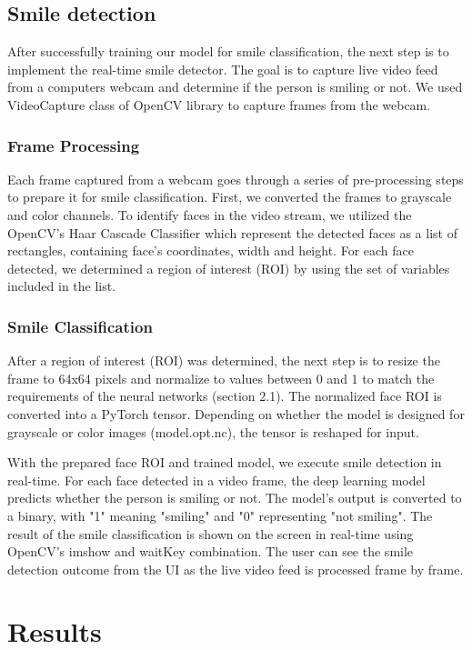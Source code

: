 \documentclass[12pt,a4paper,english
]{tunithesis}
\begin{document}
\section{Smile detection}
After successfully training our model for smile classification, the next step is to implement the real-time smile detector. The goal is to capture live video feed from a computers webcam and determine if the person is smiling or not. We used VideoCapture class of OpenCV library to capture frames from the webcam. 

\subsection{Frame Processing}
Each frame captured from a webcam goes through a series of pre-processing steps to prepare it for smile classification. First, we converted the frames to grayscale and color channels. To identify faces in the video stream, we utilized the OpenCV's Haar Cascade Classifier which represent the detected faces as a list of rectangles, containing face's coordinates, width and height. For each face detected, we determined a region of interest (ROI) by using the set of variables included in the list.

\subsection{Smile Classification}
After a region of interest (ROI) was determined, the next step is to resize the frame to 64x64 pixels and normalize to values between 0 and 1 to match the requirements of the neural networks (section 2.1). The normalized face ROI is converted into a PyTorch tensor. Depending on whether the model is designed for grayscale or color images (model.opt.nc), the tensor is reshaped for input.

With the prepared face ROI and trained model, we execute smile detection in real-time. For each face detected in a video frame, the deep learning model predicts whether the person is smiling or not. The model's output is converted to a binary, with "1" meaning "smiling" and "0" representing "not smiling". The result of the smile classification is shown on the screen in real-time using OpenCV's imshow and waitKey combination. The user can see the smile detection outcome from the UI as the live video feed is processed frame by frame.


\chapter{Results}
\label{sec:results}
\end{document}
